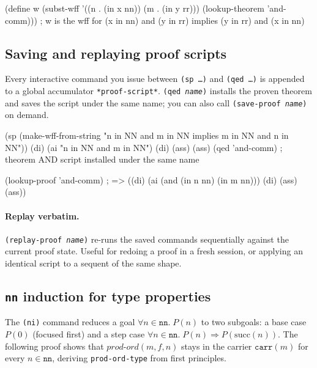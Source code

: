 \begin{VNBcode}
(define w
  (subst-wff '((n . (in x nn)) (m . (in y rr)))
             (lookup-theorem 'and-comm)))
; w is the wff for (x in nn) and (y in rr) implies (y in rr) and (x in nn)
\end{VNBcode}

\subsection{Saving and replaying proof scripts}
\label{sec:replay}

Every interactive command you issue between \texttt{(sp\ \ldots)} and
\texttt{(qed\ \ldots)} is appended to a global accumulator
\texttt{*proof-script*}.  \texttt{(qed \textit{name})} installs the
proven theorem and saves the script under the same name; you can also
call \texttt{(save-proof \textit{name})} on demand.

\begin{VNBcode}
(sp (make-wff-from-string "n in NN and m in NN implies m in NN and n in NN"))
(di) (ai "n in NN and m in NN") (di) (ass) (ass)
(qed 'and-comm)
; theorem AND script installed under the same name

(lookup-proof 'and-comm)
; => ((di) (ai (and (in n nn) (in m nn))) (di) (ass) (ass))
\end{VNBcode}

\paragraph{Replay verbatim.}
\texttt{(replay-proof \textit{name})} re-runs the saved commands
sequentially against the current proof state.  Useful for redoing a
proof in a fresh session, or applying an identical script to a sequent
of the same shape.

\subsection{\texttt{nn} induction for type properties}
\label{sec:ex-ni-type}

The \texttt{(ni)} command reduces a goal
$\forall n \in \mathtt{nn}.\; P(n)$ to two subgoals:
a base case $P(0)$ (focused first) and a step case
$\forall n \in \mathtt{nn}.\; P(n) \Rightarrow P(\mathrm{succ}(n))$.
The following proof shows that $\mathit{prod\text{-}ord}(m, f, n)$
stays in the carrier $\mathtt{carr}(m)$ for every $n \in \mathtt{nn}$,
deriving \texttt{prod-ord-type} from first principles.

